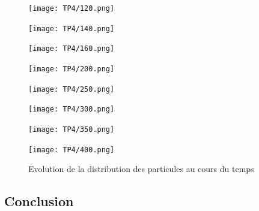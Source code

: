 \documentclass{article}
\begin{document}
\begin{figure}[h!]
\begin{minipage}[t]{4cm}
   \centering
   \texttt{[image: TP4/120.png]}
\end{minipage}
\begin{minipage}[t]{4cm}
   \centering
   \texttt{[image: TP4/140.png]}
\end{minipage}
\begin{minipage}[t]{4cm}
   \centering
   \texttt{[image: TP4/160.png]}
\end{minipage}
\begin{minipage}[t]{4cm}
   \centering
   \texttt{[image: TP4/200.png]}
\end{minipage}
\begin{minipage}[t]{4cm}
   \centering
   \texttt{[image: TP4/250.png]}
\end{minipage}
\begin{minipage}[t]{4cm}
   \centering
   \texttt{[image: TP4/300.png]}
\end{minipage}
\begin{minipage}[t]{4cm}
   \centering
   \texttt{[image: TP4/350.png]}
\end{minipage}
\begin{minipage}[t]{4cm}
   \centering
   \texttt{[image: TP4/400.png]}
\end{minipage}
\caption{Evolution de la distribution des particules au cours du temps}
\label{navigation}
\end{figure} 

\subsection{Conclusion}

\clearpage


\end{document}
